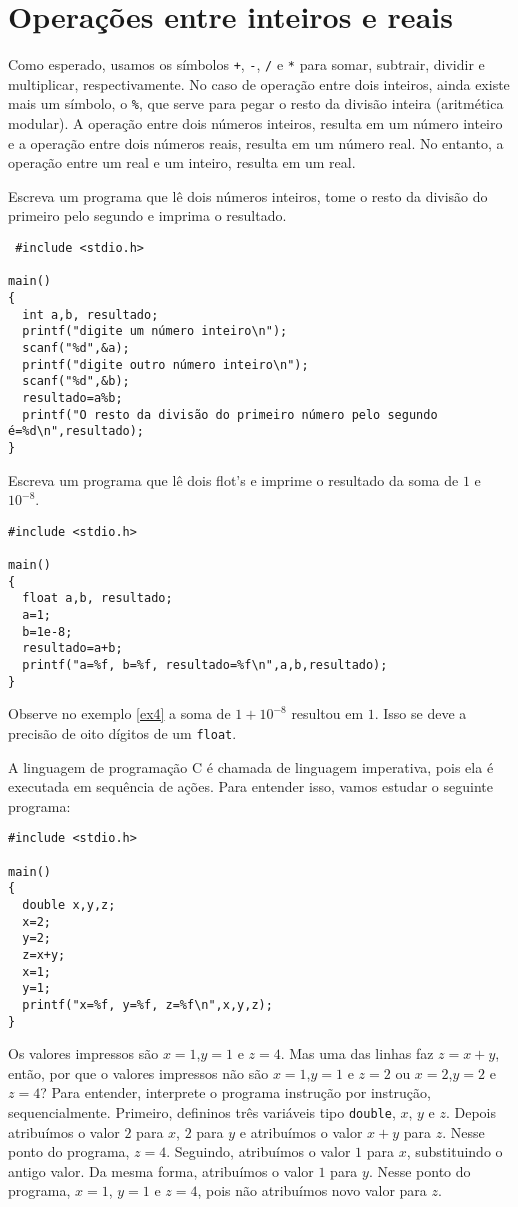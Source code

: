 \section{Operações entre inteiros e reais}
Como esperado, usamos os símbolos \verb|+|, \verb|-|, \verb|/| e \verb|*| para somar, subtrair, dividir e multiplicar, respectivamente. No caso de operação entre dois inteiros, ainda existe mais um símbolo, o \verb|%|, que serve para pegar o resto da divisão inteira (aritmética modular). A operação entre dois números inteiros, resulta em um número inteiro e a operação entre dois números reais, resulta em um número real. No entanto, a operação entre um real e um inteiro, resulta em um real.
\begin{ex}\label{ex3}Escreva um programa que lê dois números inteiros, tome o resto da divisão do primeiro pelo segundo e imprima o resultado.
\end{ex}
\begin{verbatim}
 #include <stdio.h>

main()
{
  int a,b, resultado;
  printf("digite um número inteiro\n");
  scanf("%d",&a);
  printf("digite outro número inteiro\n");
  scanf("%d",&b);
  resultado=a%b;
  printf("O resto da divisão do primeiro número pelo segundo é=%d\n",resultado); 
}
\end{verbatim}
\begin{ex}\label{ex4}Escreva um programa que lê dois flot's e imprime o resultado da soma de $1$ e $10^{-8}$.
\end{ex}
\begin{verbatim}
#include <stdio.h>

main()
{
  float a,b, resultado;
  a=1;
  b=1e-8;
  resultado=a+b;
  printf("a=%f, b=%f, resultado=%f\n",a,b,resultado); 
}
\end{verbatim}
Observe no exemplo \ref{ex4} a soma de $1+10^{-8}$ resultou em $1$. Isso se deve a precisão de oito dígitos de um \verb|float|.

A linguagem de programação C é chamada de linguagem imperativa, pois ela é executada em sequência de ações. Para entender isso, vamos estudar o seguinte programa:
\begin{verbatim}
#include <stdio.h>

main()
{
  double x,y,z;
  x=2;
  y=2;
  z=x+y;
  x=1;
  y=1;
  printf("x=%f, y=%f, z=%f\n",x,y,z); 
}
\end{verbatim}
Os valores impressos são $x=1$,$y=1$ e $z=4$. Mas uma das linhas faz $z=x+y$, então, por que o valores impressos não são $x=1$,$y=1$ e $z=2$ ou $x=2$,$y=2$ e $z=4$? Para entender, interprete o programa instrução por instrução, sequencialmente. Primeiro, defininos três variáveis tipo \verb|double|, $x$, $y$ e $z$. Depois atribuímos o valor $2$ para $x$, $2$ para $y$ e atribuímos o valor $x+y$ para $z$. Nesse ponto do programa, $z=4$. Seguindo, atribuímos o valor $1$ para $x$, substituindo o antigo valor. Da mesma forma, atribuímos o valor $1$ para $y$. Nesse ponto do programa, $x=1$, $y=1$ e $z=4$, pois não atribuímos novo valor para $z$.

